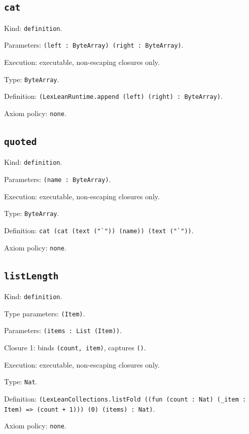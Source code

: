 \documentclass[11pt]{article}
\begin{document}
\subsection*{\texttt{cat}}
\noindent Kind: \texttt{definition}.\par
\noindent Parameters: \texttt{(left : ByteArray) (right : ByteArray)}.\par
\noindent Execution: executable, non-escaping closures only.\par
\noindent Type: \texttt{ByteArray}.\par
\noindent Definition: \texttt{(LexLeanRuntime.append (left) (right) : ByteArray)}.\par
\noindent Axiom policy: \texttt{none}.\par
\subsection*{\texttt{quoted}}
\noindent Kind: \texttt{definition}.\par
\noindent Parameters: \texttt{(name : ByteArray)}.\par
\noindent Execution: executable, non-escaping closures only.\par
\noindent Type: \texttt{ByteArray}.\par
\noindent Definition: \texttt{cat (cat (text ("`")) (name)) (text ("`"))}.\par
\noindent Axiom policy: \texttt{none}.\par
\subsection*{\texttt{listLength}}
\noindent Kind: \texttt{definition}.\par
\noindent Type parameters: \texttt{(Item)}.\par
\noindent Parameters: \texttt{(items : List (Item))}.\par
\noindent Closure 1: binds \texttt{(count, item)}, captures \texttt{()}.\par
\noindent Execution: executable, non-escaping closures only.\par
\noindent Type: \texttt{Nat}.\par
\noindent Definition: \texttt{(LexLeanCollections.listFold ((fun (count : Nat) (\_item : Item) => (count + 1))) (0) (items) : Nat)}.\par
\noindent Axiom policy: \texttt{none}.\par
\end{document}
